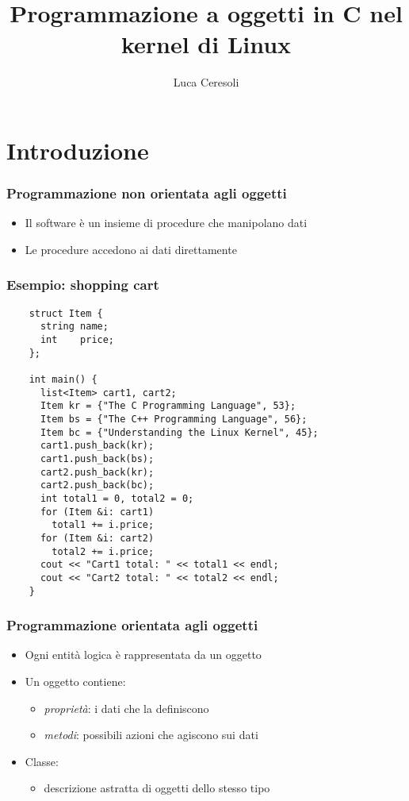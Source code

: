 \documentclass[xetex,table]{beamer}
\title{Programmazione a oggetti in C nel kernel di Linux}
\author{Luca Ceresoli}
\date{}
\begin{document}
\maketitle

\section{Introduzione}

\begin{frame}
  \frametitle{Programmazione non orientata agli oggetti}
  \begin{itemize}
  \item Il software è un insieme di procedure che manipolano dati
  \item Le procedure accedono ai dati direttamente
  \end{itemize}
\end{frame}

\begin{frame}[fragile]
  \frametitle{Esempio: shopping cart}
  \begin{verbatim}
    struct Item {
      string name;
      int    price;
    };

    int main() {
      list<Item> cart1, cart2;
      Item kr = {"The C Programming Language", 53};
      Item bs = {"The C++ Programming Language", 56};
      Item bc = {"Understanding the Linux Kernel", 45};
      cart1.push_back(kr);
      cart1.push_back(bs);
      cart2.push_back(kr);
      cart2.push_back(bc);
      int total1 = 0, total2 = 0;
      for (Item &i: cart1)
        total1 += i.price;
      for (Item &i: cart2)
        total2 += i.price;
      cout << "Cart1 total: " << total1 << endl;
      cout << "Cart2 total: " << total2 << endl;
    }
  \end{verbatim}
\end{frame}

\begin{frame}
  \frametitle{Programmazione orientata agli oggetti}
  \begin{itemize}
  \item Ogni entità logica è rappresentata da un oggetto
  \item Un oggetto contiene:
    \begin{itemize}
    \item {\em proprietà}: i dati che la definiscono
    \item {\em metodi}: possibili azioni che agiscono sui dati
  \end{itemize}
  \item Classe:
    \begin{itemize}
    \item descrizione astratta di oggetti dello stesso tipo
    \end{itemize}
  \end{itemize}
\end{frame}
\end{document}
